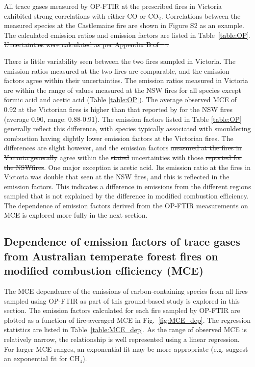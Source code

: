 \documentclass[acp, manuscript]{copernicus}
\providecommand{\DIFadd}[1]{{\protect\color{blue}\uwave{#1}}} %
\providecommand{\DIFdel}[1]{{\protect\color{red}\sout{#1}}}                      %
\providecommand{\DIFaddbegin}{} %
\providecommand{\DIFaddend}{} %
\providecommand{\DIFdelbegin}{} %
\providecommand{\DIFdelend}{} %
\begin{document}
All trace gases measured by OP-FTIR at the prescribed fires in Victoria exhibited strong correlations with either CO or CO$_2$. Correlations between the measured species at the Castlemaine fire are shown in Figure S2 as an example. The calculated emission ratios and emission factors are listed in Table~\ref{table:OP}. \DIFdelbegin \DIFdel{Uncertainties were calculated as per Appendix B of \mbox{%
\citet{Paton-Walsh2014}}\hspace{0pt}%
. 
}\DIFdelend %

There is little variability seen between the two fires sampled in Victoria. The emission ratios measured at the two fires are comparable, and the emission factors agree within their uncertainties. The emission ratios measured in Victoria are within the range of values measured at the NSW fires for all species except formic acid and acetic acid (Table \ref{table:OP}).  
The average observed MCE of 0.92 at the Victorian fires is higher than that reported by \citet{Paton-Walsh2014} for the NSW fires (average 0.90, range: 0.88-0.91). The emission factors listed in Table \ref{table:OP} generally reflect this difference, with species typically associated with smouldering combustion having slightly lower emission factors at the Victorian fires. The differences are slight however, and the emission factors \DIFdelbegin \DIFdel{measured at the fires in Victoria generally }\DIFdelend \DIFaddbegin \DIFadd{from Victoria }\DIFaddend agree within the \DIFdelbegin \DIFdel{stated }\DIFdelend uncertainties with those \DIFdelbegin \DIFdel{reported for the NSWfires}\DIFdelend \DIFaddbegin \DIFadd{from NSW}\DIFaddend . One major exception is acetic acid. Its emission ratio at the fires in Victoria was double that seen at the NSW fires, and this is reflected in the emission factors. This indicates a difference in emissions from the different regions sampled that is not explained by the difference in modified combustion efficiency. The dependence of emission factors derived from the OP-FTIR measurements on MCE is explored more fully in the next section.  


\subsection{Dependence of emission factors of trace gases from Australian temperate forest fires on modified combustion efficiency (MCE)}

The MCE dependence of the emissions of carbon-containing species from all fires sampled using OP-FTIR as part of this ground-based study is explored in this section. The emission factors calculated for each fire sampled by OP-FTIR are plotted as a function of \DIFdelbegin \DIFdel{fire-averaged }\DIFdelend MCE in Fig.~\ref{fig:MCE_dep}. The regression statistics are listed in Table~\ref{table:MCE_dep}. As the range of observed MCE is relatively narrow, the relationship is well represented using a linear regression. For larger MCE ranges, an exponential fit may be more appropriate (e.g. \citet{Meyer2012} suggest an exponential fit for CH$_4$). 
\end{document}

